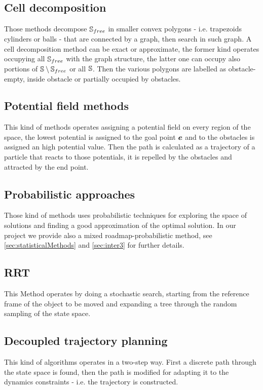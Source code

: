 \documentclass[dissertation.tex]{subfiles}
\begin{document}
\subsection{Cell decomposition}
Those methods decompose $\mathbb{S}_{free}$ in smaller convex polygons - i.e.
trapezoids cylinders or balls - that
are connected by a graph, then search in such graph. A cell
decomposition method can be exact
or approximate, the former kind operates occupying all
$\mathbb{S}_{free}$ with the graph structure, the latter one can occupy also
portions of
$\mathbb{S}\setminus\mathbb{S}_{free}$ or all $\mathbb{S}$. Then the various polygons are
labelled as obstacle-empty, inside obstacle or partially occupied by
obstacles.

\subsection{Potential field methods}
This kind of methods operates assigning a potential field on every
region of the space, the lowest potential is assigned to the goal
point $\boldsymbol{e}$ and to the obstacles is assigned an high potential
value. Then the path is calculated as a trajectory of a particle that
reacts to those potentials, it is repelled by the obstacles and
attracted by the end point.

\subsection{Probabilistic approaches}
Those kind of methods uses probabilistic techniques for exploring the
space of solutions and finding a good approximation of the optimal
solution. In our project we provide also a mixed
roadmap-probabilistic method, see \cref{sec:statisticalMethods} and
\cref{sec:inter3} for further details.

\subsection{\acf{RRT}}
This Method operates by doing a stochastic search, starting from the
reference frame of the object to be moved and expanding a tree through the
random sampling of the state space.

\subsection{Decoupled trajectory planning}
This kind of algorithms operates in a two-step way. First a
discrete path through the state space is found, then the path is modified for
adapting it to the dynamics constraints - i.e. the trajectory is constructed.
\end{document}
